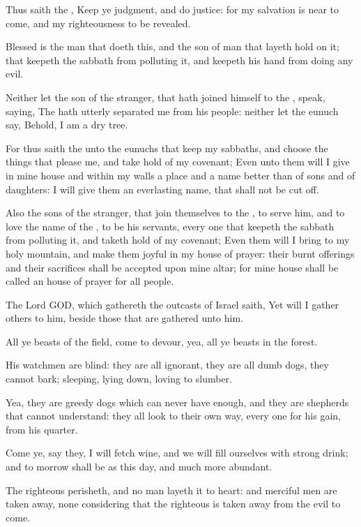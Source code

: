 \Chapter
\Verse Thus saith the \LORD, Keep ye judgment, and do justice: for my salvation is near to come, and my righteousness to be revealed.

\Verse Blessed is the man that doeth this, and the son of man that layeth hold on it; that keepeth the sabbath from polluting it, and keepeth his hand from doing any evil.

\Verse Neither let the son of the stranger, that hath joined himself to the \LORD, speak, saying, The \LORD hath utterly separated me from his people: neither let the eunuch say, Behold, I am a dry tree.

\Verse For thus saith the \LORD unto the eunuchs that keep my sabbaths, and choose the things that please me, and take hold of my covenant; \Verse Even unto them will I give in mine house and within my walls a place and a name better than of sons and of daughters: I will give them an everlasting name, that shall not be cut off.

\Verse Also the sons of the stranger, that join themselves to the \LORD, to serve him, and to love the name of the \LORD, to be his servants, every one that keepeth the sabbath from polluting it, and taketh hold of my covenant; \Verse Even them will I bring to my holy mountain, and make them joyful in my house of prayer: their burnt offerings and their sacrifices shall be accepted upon mine altar; for mine house shall be called an house of prayer for all people.

\Verse The Lord GOD, which gathereth the outcasts of Israel saith, Yet will I gather others to him, beside those that are gathered unto him.

\Verse All ye beasts of the field, come to devour, yea, all ye beasts in the forest.

\Verse His watchmen are blind: they are all ignorant, they are all dumb dogs, they cannot bark; sleeping, lying down, loving to slumber.

\Verse Yea, they are greedy dogs which can never have enough, and they are shepherds that cannot understand: they all look to their own way, every one for his gain, from his quarter.

\Verse Come ye, say they, I will fetch wine, and we will fill ourselves with strong drink; and to morrow shall be as this day, and much more abundant.


\Chapter
\Verse The righteous perisheth, and no man layeth it to heart: and merciful men are taken away, none considering that the righteous is taken away from the evil to come.

